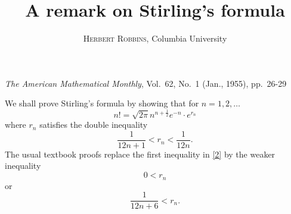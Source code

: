 \documentclass[leqno]{article}
\title{A remark on Stirling's formula}
\author{\textsc{Herbert Robbins}, Columbia University}
\date{}
\begin{document}
	
\noindent
\emph{The American Mathematical Monthly}, Vol.\ 62, No.\ 1 (Jan., 1955), pp.\ 26-29

{\let\newpage\relax\maketitle}

\maketitle

We shall prove Stirling's formula by showing that for $n=1,2,\ldots$
\begin{equation}
	n !=\sqrt{2 \pi} n^{n+\frac 12} e^{-n} \cdot e^{r_n}
\end{equation}
where $r_{n}$ satisfies the double inequality
\begin{equation} \label{2}
	\frac{1}{12 n+1}<r_{n}<\frac{1}{12 n} .
\end{equation}
The usual textbook proofs replace the first inequality in \eqref{2} by the weaker inequality
\begin{equation*}
	0<r_{n}
\end{equation*}
or
\begin{equation*}
	\frac{1}{12 n+6}<r_{n}.
\end{equation*}
\end{document}
